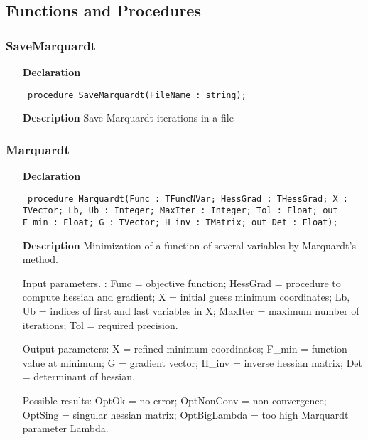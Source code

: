 \documentclass[12pt,a4paper,oneside]{report}
\newcommand{\declarationitem}[1]{\textbf{#1}}
\newcommand{\descriptiontitle}[1]{\textbf{#1}}
\newcommand{\code}[1]{\texttt{#1}}
\begin{document}
\subsection{Functions and Procedures}
\subsubsection{SaveMarquardt}
\label{umarq-SaveMarquardt}
\begin{itemize}\item[\declarationitem{Declaration}\hfill]
	\begin{flushleft}
		\code{
			procedure SaveMarquardt(FileName : string);}
		
	\end{flushleft}
	
	\par
	\item[\descriptiontitle{Description}]
	Save Marquardt iterations in a file
	
\end{itemize}
\subsubsection{Marquardt}
\label{umarq-Marquardt}
\begin{itemize}\item[\declarationitem{Declaration}\hfill]
	\begin{flushleft}
		\code{
			procedure Marquardt(Func : TFuncNVar; HessGrad : THessGrad; X : TVector; Lb, Ub : Integer; MaxIter : Integer; Tol : Float; out F{\_}min : Float; G : TVector; H{\_}inv : TMatrix; out Det : Float);}
		
	\end{flushleft}
	
	\par
	\item[\descriptiontitle{Description}]
	Minimization of a function of several variables by Marquardt's method.
	
	Input parameters. : Func = objective function; HessGrad = procedure to compute hessian and gradient; X = initial guess minimum coordinates; Lb, Ub = indices of first and last variables in X; MaxIter = maximum number of iterations; Tol = required precision.
	
	Output parameters: X = refined minimum coordinates; F{\_}min = function value at minimum; G = gradient vector; H{\_}inv = inverse hessian matrix; Det = determinant of hessian.
	
	Possible results: OptOk = no error; OptNonConv = non{-}convergence; OptSing = singular hessian matrix; OptBigLambda = too high Marquardt parameter Lambda.
	
\end{itemize}
\end{document}
